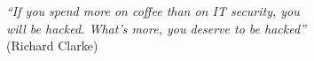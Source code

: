 \begin{titlepage}
	\thispagestyle{empty}
	\begin{flushright}
		\vspace*{40 mm}
		\small{\emph{``If you spend more on coffee than on IT security, you\\will be hacked. What's more, you deserve to be hacked''}\\(Richard Clarke)}
	\end{flushright}	
	\vfill
\end{titlepage}
\thispagestyle{empty}